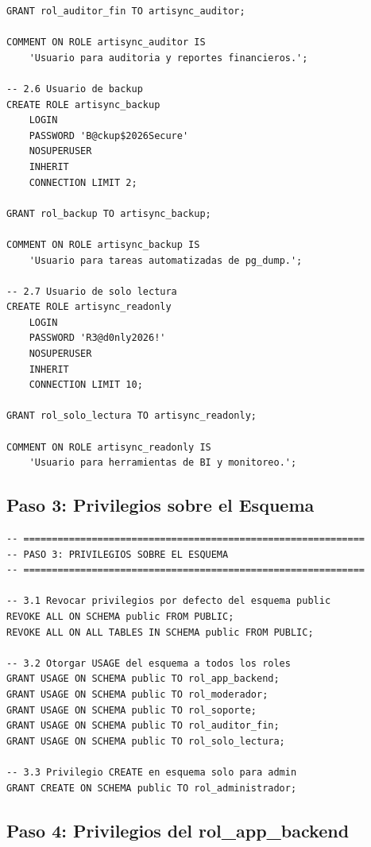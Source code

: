 \documentclass[conference, onecolumn]{IEEEtran}
\begin{document}
\begin{lstlisting}[caption={Creación de usuarios de login}, label={lst:usuarios_login}]
GRANT rol_auditor_fin TO artisync_auditor;

COMMENT ON ROLE artisync_auditor IS
    'Usuario para auditoria y reportes financieros.';

-- 2.6 Usuario de backup
CREATE ROLE artisync_backup
    LOGIN
    PASSWORD 'B@ckup$2026Secure'
    NOSUPERUSER
    INHERIT
    CONNECTION LIMIT 2;

GRANT rol_backup TO artisync_backup;

COMMENT ON ROLE artisync_backup IS
    'Usuario para tareas automatizadas de pg_dump.';

-- 2.7 Usuario de solo lectura
CREATE ROLE artisync_readonly
    LOGIN
    PASSWORD 'R3@d0nly2026!'
    NOSUPERUSER
    INHERIT
    CONNECTION LIMIT 10;

GRANT rol_solo_lectura TO artisync_readonly;

COMMENT ON ROLE artisync_readonly IS
    'Usuario para herramientas de BI y monitoreo.';
\end{lstlisting}

\subsection{Paso 3: Privilegios sobre el Esquema}

\begin{lstlisting}[caption={Privilegios sobre el esquema public}, label={lst:priv_schema}]
-- ============================================================
-- PASO 3: PRIVILEGIOS SOBRE EL ESQUEMA
-- ============================================================

-- 3.1 Revocar privilegios por defecto del esquema public
REVOKE ALL ON SCHEMA public FROM PUBLIC;
REVOKE ALL ON ALL TABLES IN SCHEMA public FROM PUBLIC;

-- 3.2 Otorgar USAGE del esquema a todos los roles
GRANT USAGE ON SCHEMA public TO rol_app_backend;
GRANT USAGE ON SCHEMA public TO rol_moderador;
GRANT USAGE ON SCHEMA public TO rol_soporte;
GRANT USAGE ON SCHEMA public TO rol_auditor_fin;
GRANT USAGE ON SCHEMA public TO rol_solo_lectura;

-- 3.3 Privilegio CREATE en esquema solo para admin
GRANT CREATE ON SCHEMA public TO rol_administrador;
\end{lstlisting}

\subsection{Paso 4: Privilegios del rol\_app\_backend}
\end{document}
